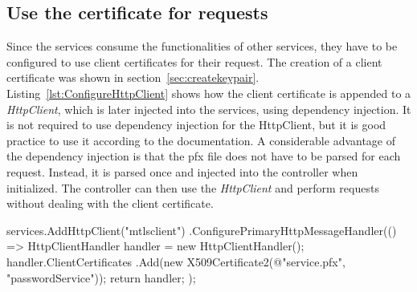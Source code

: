 \subsection{Use the certificate for requests}
Since the services consume the functionalities of other services, they have to be configured to use client certificates for their request.
The creation of a client certificate was shown in section~\ref{sec:createkeypair}.
Listing~\ref{lst:ConfigureHttpClient} shows how the client certificate is appended to a \textit{HttpClient}, which is later injected into the services, using dependency injection.
It is not required to use dependency injection for the HttpClient, but it is good practice to use it according to the documentation.
A considerable advantage of the dependency injection is that the pfx file does not have to be parsed for each request.
Instead, it is parsed once and injected into the controller when initialized.
The controller can then use the \textit{HttpClient} and perform requests without dealing with the client certificate.

\noindent \begin{minipage}{\linewidth}
\begin{CsCode}[label={lst:ConfigureHttpClient}, caption={Append Certificate to HttpClient~\cite{implclientfactory, implconfighandler}},captionpos=b]
services.AddHttpClient("mtlsclient")
.ConfigurePrimaryHttpMessageHandler(() => {
    HttpClientHandler handler = new HttpClientHandler();
    handler.ClientCertificates
        .Add(new X509Certificate2(@"service.pfx", "passwordService"));
    return handler;
});
\end{CsCode}
\end{minipage}

%
%
%

